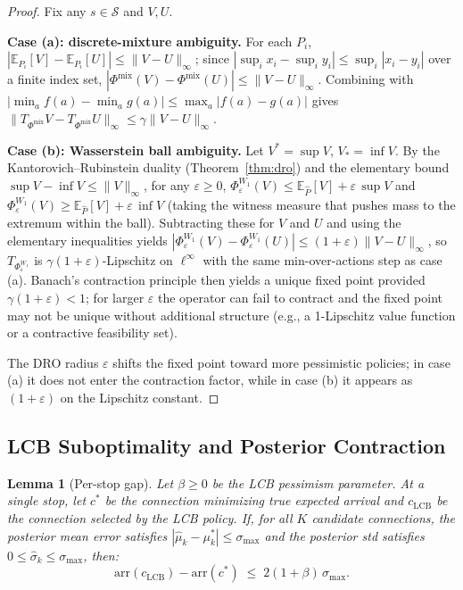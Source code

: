 \documentclass[11pt]{article}
\newtheorem{lemma}[theorem]{Lemma}
\theoremstyle{definition}
\theoremstyle{remark}
\begin{document}
\begin{proof}
Fix any $s \in \mathcal{S}$ and $V, U$.

\noindent\textbf{Case (a): discrete-mixture ambiguity.}
For each $P_i$, $|\mathbb{E}_{P_i}[V] - \mathbb{E}_{P_i}[U]| \leq \|V-U\|_\infty$;
since $|\sup_i x_i - \sup_i y_i| \leq \sup_i |x_i - y_i|$ over a finite
index set,
$|\Phi^{\mathrm{mix}}(V) - \Phi^{\mathrm{mix}}(U)| \leq \|V-U\|_\infty$.
Combining with $|\min_a f(a) - \min_a g(a)| \leq \max_a |f(a)-g(a)|$
gives $\|T_{\Phi^{\mathrm{mix}}}V - T_{\Phi^{\mathrm{mix}}}U\|_\infty \leq
\gamma\|V-U\|_\infty$.

\noindent\textbf{Case (b): Wasserstein ball ambiguity.}
Let $V^* = \sup V$, $V_* = \inf V$. By the Kantorovich--Rubinstein duality
(Theorem~\ref{thm:dro}) and the elementary bound
$\sup V - \inf V \leq \|V\|_\infty$, for any $\varepsilon\!\geq\!0$,
$\Phi^{W_1}_\varepsilon(V) \leq \mathbb{E}_{\hat P}[V] + \varepsilon\,\sup V$
and $\Phi^{W_1}_\varepsilon(V) \geq \mathbb{E}_{\hat P}[V] + \varepsilon\,\inf V$
(taking the witness measure that pushes mass to the extremum within the
ball). Subtracting these for $V$ and $U$ and using the elementary
inequalities yields
$|\Phi^{W_1}_\varepsilon(V) - \Phi^{W_1}_\varepsilon(U)| \leq
(1+\varepsilon)\|V-U\|_\infty$,
so $T_{\Phi^{W_1}_\varepsilon}$ is $\gamma(1+\varepsilon)$-Lipschitz on
$\ell^\infty$ with the same min-over-actions step as case (a). Banach's
contraction principle then yields a unique fixed point provided
$\gamma(1+\varepsilon) < 1$; for larger $\varepsilon$ the operator can
fail to contract and the fixed point may not be unique without
additional structure (e.g., a 1-Lipschitz value function or a
contractive feasibility set).

The DRO radius $\varepsilon$ shifts the fixed point toward more
pessimistic policies; in case (a) it does not enter the contraction
factor, while in case (b) it appears as $(1+\varepsilon)$ on the
Lipschitz constant.
\end{proof}

\subsection{LCB Suboptimality and Posterior Contraction}

\begin{lemma}[Per-stop gap]\label{lem:perstep}
Let $\beta \geq 0$ be the LCB pessimism parameter. At a single stop,
let $c^*$ be the connection minimizing true expected arrival and
$c_{\mathrm{LCB}}$ be the connection selected by the LCB policy.
If, for all $K$ candidate connections, the posterior mean error
satisfies $|\hat\mu_k - \mu^*_k| \leq \sigma_{\max}$ and the
posterior std satisfies $0 \leq \hat\sigma_k \leq \sigma_{\max}$,
then:
\[
\mathrm{arr}(c_{\mathrm{LCB}}) - \mathrm{arr}(c^*) \;\leq\; 2(1+\beta)\,\sigma_{\max}.
\]
\end{lemma}
\end{document}

